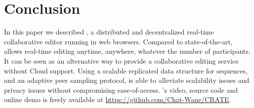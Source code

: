 
\section{Conclusion}
\label{sec:conclusion}

In this paper we described \CRATE, a distributed and decentralized
real-time collaborative editor running in web browsers. Compared to
state-of-the-art, \CRATE allows real-time editing anytime, anywhere,
whatever the number of participants. It can be seen as an alternative way
to provide a collaborative editing service without Cloud support. Using
a scalable replicated data structure for sequences, and an adaptive
peer sampling protocol, \CRATE is able to alleviate scalability issues
and privacy issues without compromising ease-of-access. \CRATE's video,
source code and online demo is freely available at
\url{https://github.com/Chat-Wane/CRATE}.

